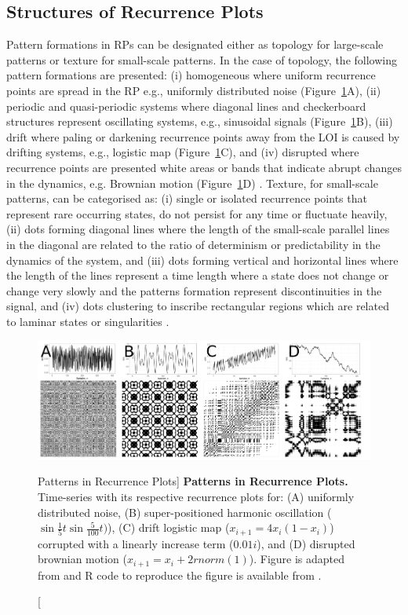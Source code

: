 \subsection{Structures of Recurrence Plots}
Pattern formations in RPs can be designated either 
as topology for large-scale patterns or texture for small-scale patterns.
In the case of topology, the following pattern formations are presented:
(i) homogeneous where uniform recurrence points are spread in the RP e.g., 
uniformly distributed noise (Figure~\ref{fig:rp2}A), 
(ii) periodic and quasi-periodic systems where diagonal lines and 
checkerboard structures represent oscillating systems, e.g., sinusoidal 
signals (Figure~\ref{fig:rp2}B), 
(iii) drift where paling or darkening recurrence points away from 
the LOI is caused by drifting systems, 
e.g., logistic map (Figure~\ref{fig:rp2}C), and
(iv) disrupted where recurrence points are presented white areas or 
bands that indicate abrupt changes in the dynamics, e.g. Brownian motion 
(Figure~\ref{fig:rp2}D) \citep{eckmann1987, marwan2015}.
Texture, for small-scale patterns, can be categorised as:
(i) single or isolated recurrence points that represent rare occurring 
states, do not persist for any time or fluctuate heavily,
(ii) dots forming diagonal lines where the length of the small-scale parallel 
lines in the diagonal are related to the ratio of determinism or 
predictability in the dynamics of the system, and
(iii) dots forming vertical and horizontal lines where the length of the 
lines represent a time length where a state does not change or change very 
slowly and the patterns formation represent discontinuities in the signal, and
(iv) dots clustering to inscribe rectangular regions which are related 
to laminar states or singularities \citep{marwan2015}.

\begin{figure}
  \centering
    \includegraphics[width=1.0\textwidth]{rpsp}
    \caption
	[Patterns in Recurrence Plots]{
	{\bf Patterns in Recurrence Plots.} 
	Time-series with its respective recurrence plots for:
	(A) uniformly distributed noise,
	(B) super-positioned harmonic oscillation 
	($\sin{ \frac{1}{5} t} \sin{ \frac{5}{100}t) }$),
	(C) drift logistic map ($x_{i+1} = 4 x_i (1- x_i) $) corrupted 
	with a linearly increase term ($0.01 i$), and
	(D) disrupted brownian motion  ($x_{i+1} = x_i + 2rnorm(1) $).
	Figure is adapted from \cite{marwan2015} and R code to reproduce 
	the figure is available from \cite{hwum2018}.
	}
    \label{fig:rp2}
\end{figure}

